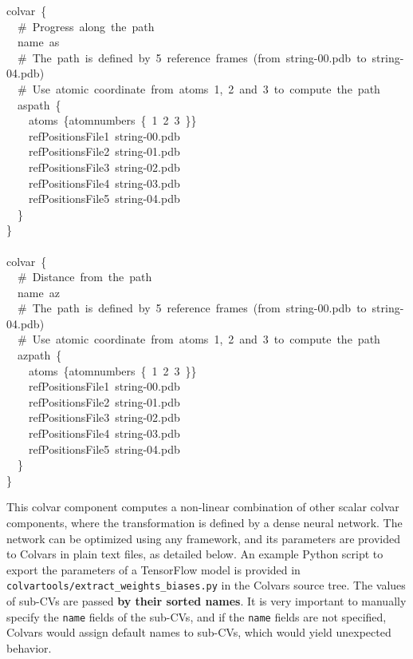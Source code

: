 \begin{cvexampleinput}
\-colvar~\{\\
\-~~\#~Progress~along~the~path\\
\-~~name~as\\
\-~~\#~The~path~is~defined~by~5~reference~frames~(from~string-00.pdb~to~string-04.pdb)\\
\-~~\#~Use~atomic~coordinate~from~atoms~1,~2~and~3~to~compute~the~path\\
\-~~aspath~\{\\
\-~~~~atoms~\{atomnumbers~\{~1~2~3~\}\}\\
\-~~~~refPositionsFile1~string-00.pdb\\
\-~~~~refPositionsFile2~string-01.pdb\\
\-~~~~refPositionsFile3~string-02.pdb\\
\-~~~~refPositionsFile4~string-03.pdb\\
\-~~~~refPositionsFile5~string-04.pdb\\
\-~~\}\\
\-\}\\
\-\\
\-colvar~\{\\
\-~~\#~Distance~from~the~path\\
\-~~name~az\\
\-~~\#~The~path~is~defined~by~5~reference~frames~(from~string-00.pdb~to~string-04.pdb)\\
\-~~\#~Use~atomic~coordinate~from~atoms~1,~2~and~3~to~compute~the~path\\
\-~~azpath~\{\\
\-~~~~atoms~\{atomnumbers~\{~1~2~3~\}\}\\
\-~~~~refPositionsFile1~string-00.pdb\\
\-~~~~refPositionsFile2~string-01.pdb\\
\-~~~~refPositionsFile3~string-02.pdb\\
\-~~~~refPositionsFile4~string-03.pdb\\
\-~~~~refPositionsFile5~string-04.pdb\\
\-~~\}\\
\}
\end{cvexampleinput}


This colvar component computes a non-linear combination of other scalar colvar components, where the transformation is defined by a dense neural network.\cite{Chen2022}
The network can be optimized using any framework, and its parameters are provided to Colvars in plain text files, as detailed below.
An example Python script to export the parameters of a TensorFlow model is provided in \texttt{colvartools/extract\_weights\_biases.py} in the Colvars source tree. The values of sub-CVs are passed \textbf{by their sorted names}. It is very important to manually specify the \texttt{name} fields of the sub-CVs, and if the \texttt{name} fields are not specified, Colvars would assign default names to sub-CVs, which would yield unexpected behavior.

